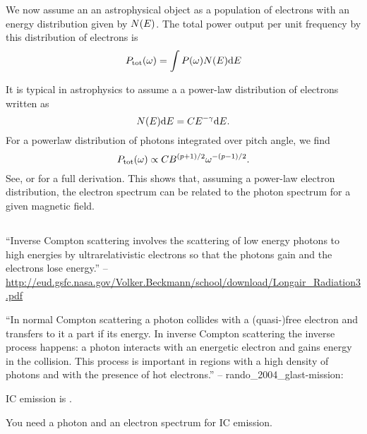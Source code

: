 We now assume an an astrophysical object
as a population of electrons with an energy
distribution given by $N(E)$.
The total power output per unit frequency by this distribution
of electrons is
\begin{equation}
P_\text{tot}(\omega) = 
\int P(\omega) N(E) \text{d}E 
\end{equation}

It is typical in astrophysics to assume a 
a power-law distribution of electrons written as
\begin{equation}
  N(E) \text{d}E = C E^{-\gamma} \text{d}E.
\end{equation}
For a powerlaw distribution of photons integrated over
pitch angle, we find 
\begin{equation}
P_\text{tot}(\omega) \propto C B^{(p+1)/2} 
\omega^{-(p-1)/2}.
\end{equation}
See, \cite{rybicki_1979a_radiative-processes} 
or \cite{longair_2013a_energy-astrophysics} for a full derivation.
This shows that, assuming a power-law electron distribution,
the electron spectrum can be related to the photon spectrum 
for a given magnetic field.

\subsection{}

``Inverse Compton scattering involves the scattering of low
energy photons to high energies by ultrarelativistic electrons
so that the photons gain and the electrons lose energy.'' --
\url{http://eud.gsfc.nasa.gov/Volker.Beckmann/school/download/Longair_Radiation3.pdf}

``In normal Compton scattering a photon
collides with a (quasi-)free electron and transfers to it a part if
its energy. In inverse Compton scattering the inverse process happens:
a photon interacts with an energetic electron and gains energy in the
collision. This process is important in regions with a high density of
photons and with the presence of hot electrons.'' -- rando\_2004\_glast-mission:


\Gls{IC} emission is .

You need a photon and an electron spectrum for \ac{IC} emission.

